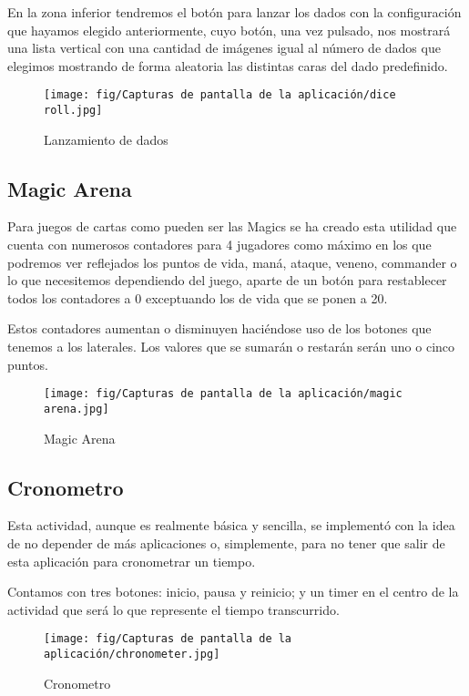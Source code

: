 En la zona inferior tendremos el botón para lanzar los dados con la configuración que hayamos elegido anteriormente, cuyo botón, una vez pulsado, nos mostrará una lista vertical con una cantidad de imágenes igual al número de dados que elegimos mostrando de forma aleatoria las distintas caras del dado predefinido. 

\begin{figure}[H]
    \centering
    \texttt{[image: fig/Capturas de pantalla de la aplicación/dice roll.jpg]}
    \caption{Lanzamiento de dados}
    \label{fig:lanzamiento dados}
\end{figure}

\subsection{Magic Arena}

Para juegos de cartas como pueden ser las Magics se ha creado esta utilidad que cuenta con numerosos contadores para 4 jugadores como máximo en los que podremos ver reflejados los puntos de vida, maná, ataque, veneno, commander o lo que necesitemos dependiendo del juego, aparte de un botón para restablecer todos los contadores a 0 exceptuando los de vida que se ponen a 20. 

Estos contadores aumentan o disminuyen haciéndose uso de los botones que tenemos a los laterales. Los valores que se sumarán o restarán serán uno o cinco puntos.

\begin{figure}[H]
    \centering
    \texttt{[image: fig/Capturas de pantalla de la aplicación/magic arena.jpg]}
    \caption{Magic Arena}
    \label{fig:magic arena}
\end{figure}

\subsection{Cronometro}

Esta actividad, aunque es realmente básica y sencilla, se implementó con la idea de no depender de más aplicaciones o, simplemente, para no tener que salir de esta aplicación para cronometrar un tiempo.

Contamos con tres botones: inicio, pausa y reinicio; y un timer en el centro de la actividad que será lo que represente el tiempo transcurrido.


\begin{figure}[H]
    \centering
    \texttt{[image: fig/Capturas de pantalla de la aplicación/chronometer.jpg]}
    \caption{Cronometro}
    \label{fig:cronometro}
\end{figure}

